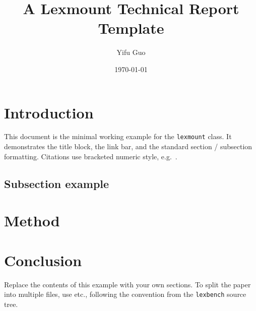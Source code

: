 \documentclass{lexmount}
\title{A Lexmount Technical Report Template}
\author[*]{Yifu Guo}
\affiliation[1]{Lexmount}
\date{\today}
\begin{document}
\thispagestyle{firstheader}
\maketitle

\section{Introduction}
\label{sec:intro}

This document is the minimal working example for the \texttt{lexmount}
class. It demonstrates the title block, the link bar, and the standard
section / subsection formatting. Citations use bracketed numeric style,
e.g.\ \citep{example2024}.

\subsection{Subsection example}
\lipsum[1]

\section{Method}
\label{sec:method}

\lipsum[2]

\section{Conclusion}
\label{sec:conclusion}

Replace the contents of this example with your own sections. To split
the paper into multiple files, use \verb|| etc.,
following the convention from the \texttt{lexbench} source tree.



\end{document}
